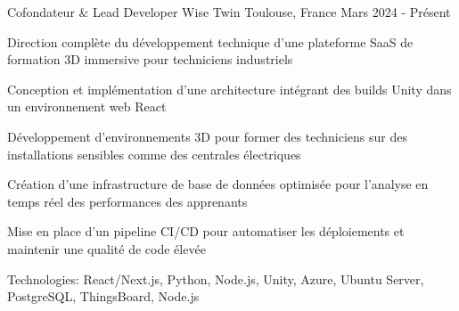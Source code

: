 


\begin{cventries}


\cventry
{Cofondateur \& Lead Developer} %
{Wise Twin} %
{Toulouse, France} %
{Mars 2024 - Présent} %
{ %
\begin{cvitems}
\item {Direction complète du développement technique d'une plateforme SaaS de formation 3D immersive pour techniciens industriels}
\item {Conception et implémentation d'une architecture intégrant des builds Unity dans un environnement web React}
\item {Développement d'environnements 3D pour former des techniciens sur des installations sensibles comme des centrales électriques}
\item {Création d'une infrastructure de base de données optimisée pour l'analyse en temps réel des performances des apprenants}
\item {Mise en place d'un pipeline CI/CD pour automatiser les déploiements et maintenir une qualité de code élevée}
\item {Technologies: React/Next.js, Python, Node.js, Unity, Azure, Ubuntu Server, PostgreSQL, ThingsBoard, Node.js}
\end{cvitems}
}
\vspace{1.5em}



\end{cventries}
